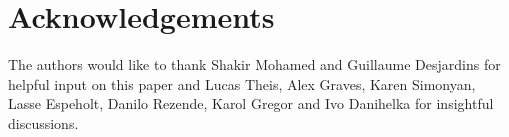 
\section*{Acknowledgements}

The authors would like to thank Shakir Mohamed and Guillaume Desjardins for helpful input on this paper and Lucas Theis, Alex Graves, Karen Simonyan, Lasse Espeholt, Danilo Rezende, Karol Gregor and Ivo Danihelka for insightful discussions.
